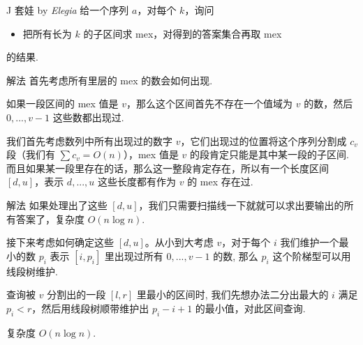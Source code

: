 \begin{frame}{J 套娃 {by \itshape Elegia}}
	给一个序列 $a$，对每个 $k$，询问
	\begin{itemize}
	\item 把所有长为 $k$ 的子区间求 mex，对得到的答案集合再取 mex
	\end{itemize}
	的结果.


\end{frame}

\begin{frame}{解法}
	首先考虑所有里层的 mex 的数会如何出现. \pause

	如果一段区间的 mex 值是 $v$，那么这个区间首先不存在一个值域为 $v$ 的数，然后 $0,...,v-1$ 这些数都出现过. \pause

	我们首先考虑数列中所有出现过的数字 $v$，它们出现过的位置将这个序列分割成 $c_v$ 段（我们有 $\sum c_v=O(n)$），mex 值是 $v$ 的段肯定只能是其中某一段的子区间. 而且如果某一段里存在的话，那么这一整段肯定存在，所以有一个长度区间 $[d, u]$，表示 $d,...,u$ 这些长度都有作为 $v$ 的 mex 存在过.

\end{frame}


\begin{frame}{解法}
	如果处理出了这些 $[d, u]$，我们只需要扫描线一下就就可以求出要输出的所有答案了，复杂度 $O(n \log n)$. \pause

	接下来考虑如何确定这些 $[d, u]$。从小到大考虑 $v$，对于每个 $i$ 我们维护一个最小的数 $p_i$ 表示 $[i, p_i]$ 里出现过所有 $0,...,v-1$ 的数, 那么 $p_i$ 这个阶梯型可以用线段树维护. \pause

	查询被 $v$ 分割出的一段 $[l, r]$ 里最小的区间时, 我们先想办法二分出最大的 $i$ 满足 $p_i < r$，然后用线段树顺带维护出 $p_i - i + 1$ 的最小值，对此区间查询. \pause

	复杂度 $O(n \log n)$.


\end{frame}
